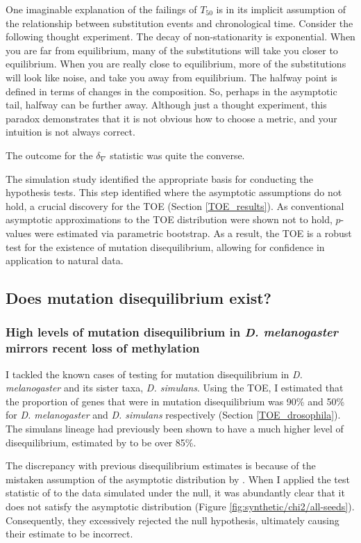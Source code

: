 One imaginable explanation of the failings of $T_{50}$ is in its implicit assumption of the relationship between substitution events and chronological time. Consider the following thought experiment. The decay of non-stationarity is exponential. When you are far from equilibrium, many of the substitutions will take you closer to equilibrium. When you are really close to equilibrium, more of the substitutions will look like noise, and take you away from equilibrium. The halfway point is defined in terms of changes in the composition. So, perhaps in the asymptotic tail, halfway can be further away. Although just a thought experiment, this paradox demonstrates that it is not obvious how to choose a metric, and your intuition is not always correct. 

The outcome for the $\delta_\nabla$ statistic was quite the converse.

The simulation study identified the appropriate basis for conducting the hypothesis tests. This step identified where the asymptotic assumptions do not hold, a crucial discovery for the TOE (Section \ref{TOE_results}). As conventional asymptotic approximations to the TOE distribution were shown not to hold, $p$-values were estimated via parametric bootstrap. As a result, the TOE is a robust test for the existence of mutation disequilibrium, allowing for confidence in application to natural data. 

\subsection{Does mutation disequilibrium exist?}

\subsubsection{High levels of mutation disequilibrium in \textit{D. melanogaster} mirrors recent loss of methylation}
I tackled the known cases of testing for mutation disequilibrium in \textit{D. melanogaster} and its sister taxa, \textit{D. simulans}. Using the TOE, I estimated that the proportion of genes that were in mutation disequilibrium was 90\% and 50\% for \textit{D. melanogaster} and \textit{D. simulans} respectively (Section \ref{TOE_drosophila}).  The simulans lineage had previously been shown to have a much higher level of disequilibrium, estimated by \cite{Squartini2008QuantifyingProcess} to be over 85\%. 

The discrepancy with previous disequilibrium estimates is because of the mistaken assumption of the asymptotic distribution by \cite{Squartini2008QuantifyingProcess}. When I applied the test statistic of \cite{Squartini2008QuantifyingProcess} to the data simulated under the null, it was abundantly clear that it does not satisfy the asymptotic distribution (Figure \ref{fig:synthetic/chi2/all-seeds}). Consequently, they excessively rejected the null hypothesis, ultimately causing their estimate to be incorrect.

